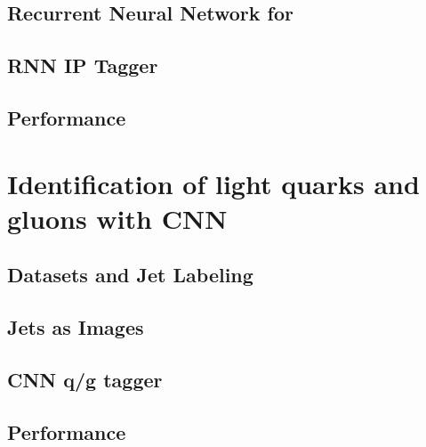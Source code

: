 \documentclass{report}
\begin{document}
\section{Recurrent Neural Network for \btagging}

\clearpage

\section{RNN IP Tagger}

\clearpage

\section{Performance}


\clearpage


\chapter{Identification of light quarks and gluons with CNN}
\label{chap:qgtagging}


\clearpage

\section{Datasets and Jet Labeling}

\clearpage

\section{Jets as Images}

\clearpage

%

\section{CNN q/g tagger}

\clearpage

\section{Performance}

\clearpage
\end{document}
